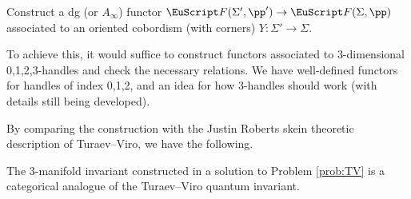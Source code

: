 \documentclass[11pt]{amsart}
\begin{document}
%


\begin{problem}\label{prob:TV}
Construct a dg (or $A_\infty$) functor $\FS(\Sigma',\pp')\to \FS(\Sigma,\pp)$ associated to an oriented cobordism (with corners) $Y\colon \Sigma'\to \Sigma$.
\end{problem}

To achieve this, it would suffice to construct functors associated to 3-dimensional 0,1,2,3-handles and check the necessary relations.   We have well-defined functors for handles of index 0,1,2, and an idea for how 3-handles should work (with details still being developed).  

By comparing the construction with the Justin Roberts skein theoretic description of Turaev--Viro, we have the following. 

\begin{expectation}
The 3-manifold invariant constructed in a solution to Problem \ref{prob:TV} is a categorical analogue of the Turaev--Viro quantum invariant.
\end{expectation}






\printbibliography
\end{document}
